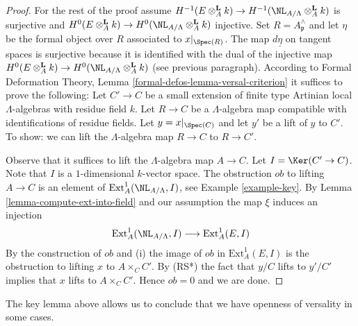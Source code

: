 \begin{proof}
\medskip\noindent
For the rest of the proof assume $H^{-1}(E \otimes_A^\mathbf{L} k) \to
H^{-1}(\NL_{A/\Lambda} \otimes_A^\mathbf{L} k)$
is surjective and
$H^0(E \otimes_A^\mathbf{L} k) \to
H^0(\NL_{A/\Lambda} \otimes_A^\mathbf{L} k)$
injective. Set $R = A_\mathfrak p^\wedge$ and let $\eta$ be the
formal object over $R$ associated to $x|_{\Spec(R)}$.
The map $d\underline{\eta}$ on tangent spaces is surjective
because it is identified with the dual of the injective map
$H^0(E \otimes_A^{\mathbf{L}} k) \to
H^0(\NL_{A/\Lambda} \otimes_A^{\mathbf{L}} k)$
(see previous paragraph). According to
Formal Deformation Theory, Lemma \ref{formal-defos-lemma-versal-criterion}
it suffices to prove the following:
Let $C' \to C$ be a small extension of finite type Artinian local
$\Lambda$-algebras with residue field $k$. Let $R \to C$ be a
$\Lambda$-algebra map compatible with identifications of residue fields.
Let $y = x|_{\Spec(C)}$ and let $y'$ be a lift of $y$ to $C'$.
To show: we can lift the $\Lambda$-algebra map $R \to C$ to $R \to C'$.

\medskip\noindent
Observe that it suffices to lift the $\Lambda$-algebra map $A \to C$.
Let $I = \Ker(C' \to C)$. Note that $I$ is a $1$-dimensional $k$-vector
space. The obstruction $ob$ to lifting $A \to C$ is an element of
$\text{Ext}^1_A(\NL_{A/\Lambda}, I)$, see Example \ref{example-key}.
By Lemma \ref{lemma-compute-ext-into-field} and our assumption the map
$\xi$ induces an injection
$$
\text{Ext}^1_A(\NL_{A/\Lambda}, I)
\longrightarrow
\text{Ext}^1_A(E, I)
$$
By the construction of $ob$ and (i) the image of $ob$ in $\text{Ext}^1_A(E, I)$
is the obstruction to lifting $x$ to $A \times_C C'$. By (RS*) the fact that
$y/C$ lifts to $y'/C'$ implies that $x$ lifts to $A \times_C C'$. Hence
$ob = 0$ and we are done.
\end{proof}

\noindent
The key lemma above allows us to conclude that we have openness of
versality in some cases.

